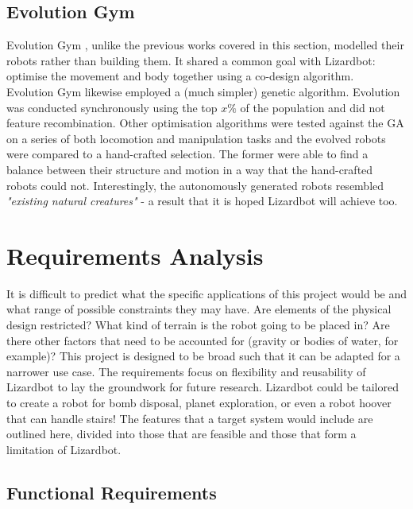 \documentclass{article}
\begin{document}
\subsection{Evolution Gym}
\label{sec:Evolution Gym}
Evolution Gym , unlike the previous works covered in this section, modelled their robots rather than building them. It shared a common goal with Lizardbot: optimise the movement and body together using a co-design algorithm. \\

Evolution Gym likewise employed a (much simpler) genetic algorithm. Evolution was conducted synchronously using the top $x\%$ of the population and did not feature recombination. Other optimisation algorithms were tested against the GA on a series of both locomotion and manipulation tasks and the evolved robots were compared to a hand-crafted selection. The former were able to find a balance between their structure and motion in a way that the hand-crafted robots could not. Interestingly, the autonomously generated robots resembled \textit{"existing natural creatures"} - a result that it is hoped Lizardbot will achieve too.

\newpage
\section{Requirements Analysis}
\label{sec:Requirements Analysis}
It is difficult to predict what the specific applications of this project would be and what range of possible constraints they may have. Are elements of the physical design restricted? What kind of terrain is the robot going to be placed in? Are there other factors that need to be accounted for (gravity or bodies of water, for example)? This project is designed to be broad such that it can be adapted for a narrower use case. The requirements focus on flexibility and reusability of Lizardbot to lay the groundwork for future research. Lizardbot could be tailored to create a robot for bomb disposal, planet exploration, or even a robot hoover that can handle stairs!
The features that a target system would include are outlined here, divided into those that are feasible and those that form a limitation of Lizardbot.

\subsection{Functional Requirements}
\label{sec:Functional Requirements}
\end{document}
